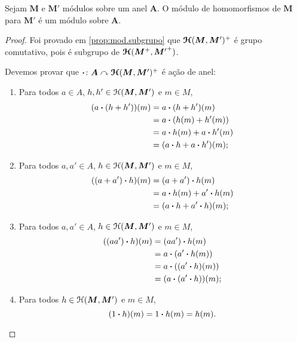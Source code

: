 \begin{proposition}
Sejam $\bm M$ e $\bm M'$ módulos sobre um anel $\bm A$. O módulo de homomorfismos de $\bm M$ para $\bm M'$ é um módulo sobre $\bm A$.
\end{proposition}
\begin{proof}
Foi provado em \ref{prop:mod.subgrupo} que $\bm{\mathcal{H}}(\bm M,\bm M')^+$ é grupo comutativo, pois é subgrupo de $\bm{\mathcal{H}}(\bm M^+,{\bm M'}^+)$.

Devemos provar que ${\bm{\cdot}}\colon {\bm A} \curvearrowright {\bm{\mathcal{H}}(\bm M,\bm M')^+}$ é ação de anel:
	\begin{enumerate}
	\item Para todos $a \in A$, $h,h' \in \mathcal{H}(\bm M,\bm M')$ e $m \in M$,
		\begin{align*}
		(a \bm{\cdot} (h+h'))(m) &= a \bm{\cdot} (h+h')(m) \\
			&= a \bm{\cdot} (h(m) + h'(m)) \\
			&= a \bm{\cdot} h(m) + a \bm{\cdot} h'(m) \\
			&= (a \bm{\cdot} h + a \bm{\cdot} h')(m);
		\end{align*}
	\item Para todos $a,a' \in A$, $h \in \mathcal{H}(\bm M,\bm M')$ e $m \in M$,
		\begin{align*}
		((a+a') \bm{\cdot} h)(m) &= (a+a') \bm{\cdot} h(m) \\
			&= a \bm{\cdot} h(m) + a' \bm{\cdot} h(m) \\
			&= (a \bm{\cdot} h + a' \bm{\cdot} h)(m);
		\end{align*}
	\item Para todos $a,a' \in A$, $h \in \mathcal{H}(\bm M,\bm M')$ e $m \in M$,
		\begin{align*}
		((aa') \bm{\cdot} h)(m) &= (aa') \bm{\cdot} h(m) \\
			&= a \bm{\cdot} (a' \bm{\cdot} h(m)) \\
			&= a \bm{\cdot} ((a' \bm{\cdot} h)(m)) \\
			&= (a \bm{\cdot} (a' \bm{\cdot} h))(m);
		\end{align*}
	\item Para todos $h \in \mathcal{H}(\bm M,\bm M')$ e $m \in M$,
		\begin{equation*}
		(1 \bm{\cdot} h)(m) = 1 \bm{\cdot} h(m) = h(m).
		\qedhere
		\end{equation*}
	\end{enumerate}
\end{proof}




